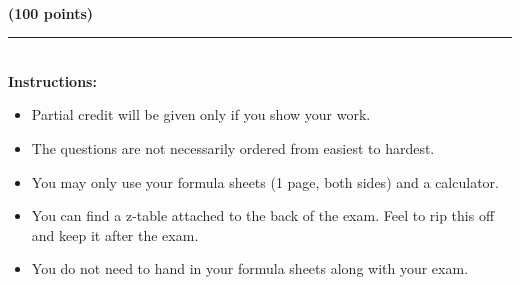 \documentclass[12pt]{article}
\begin{document}
\begin{center}
  \textbf{\large \semester{}} \hfill \textbf{\large \class{}} \hfill \textbf{\large \exam{}}\\
  \hfill \textbf{(100 points)}
\end{center}

\vspace*{1in}

 \rule{5in}{.01in}\\[1in]

\textbf{Instructions:}\\
\begin{itemize}
\item {\large Partial credit will be given only if you show your work.}
\item {\large The questions are not necessarily ordered from easiest to hardest.}
\item {\large You may only use your formula sheets (1 page, both sides) and a calculator.}
\item {\large You can find a z-table attached to the back of the exam. Feel to rip this off and keep it after the exam.}
\item {\large You do not need to hand in your formula sheets along with your exam.}
\end{itemize}
\end{document}
